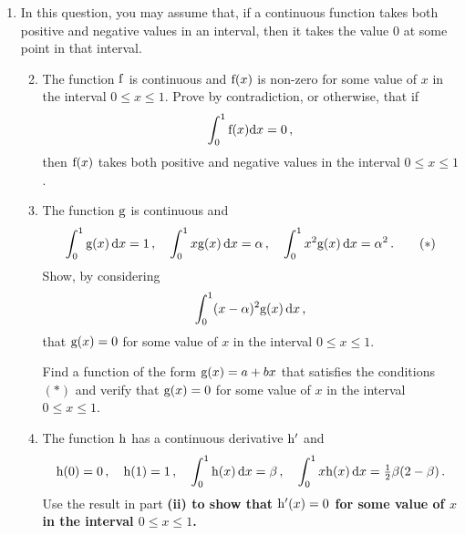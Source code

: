 \documentclass[a4, 11pt]{report}
\newlength{\qspace}
\newcounter{qnumber}
\newenvironment{question}%
 {\vspace{\qspace}
  \begin{enumerate}[\bfseries 1\quad][10]%
    \setcounter{enumi}{\value{qnumber}}%
    \item%
 }
{
  \end{enumerate}
  \filbreak
  \stepcounter{qnumber}
 }
\newenvironment{questionparts}[1][1]%
 {
  \begin{enumerate}[\bfseries (i)]%
    \setcounter{enumii}{#1}
    \addtocounter{enumii}{-1}
    \setlength{\itemsep}{5mm}
    \setlength{\parskip}{8pt}
 }
 {
  \end{enumerate}
 }
\def\d{{\rm d}}
\def\g{{\rm g}}
\def\h{{\rm h}}
\def\f{{\rm f}}
\def\le{\leqslant}
\newcommand{\ds}{\displaystyle}
\newcommand{\ts}{\textstyle}
\begin{document}
\vspace{-3mm}

\begin{question}

In this question, you may assume that, if a continuous  function 
takes both positive and negative values in an interval, then
it takes the value $0$ at some point in that interval. 


\begin{questionparts}
\item
The function  $\f$ is continuous and $\f(x)$ is non-zero for some value 
of $x$ in the interval $0\le x \le 1$. Prove by contradiction, or otherwise,
 that if
\[
\int_0^1 \f(x) \d x = 0\,,
\]
then 
 $\f(x)$ takes both positive and negative values 
in the interval $0\le x\le 1$.


\item The function  $\g$ is continuous and
\[
\int_0^1 \g(x) \, \d x = 1\,,
 \quad 
\int_0^1 x\g(x) \, \d x = \alpha\, , 
\quad 
\int_0^1 x^2\g(x) \, \d x = \alpha^2\,.
\tag{$*$}
\] 
 Show, by considering
\[
\int_0^1 (x - \alpha)^2 \g(x) \, \d x
\,,
\]
 that
$\g(x)=0$ for some value of $x$ in the interval $0\le x\le 1$.

Find a function of the  form $\g(x) = a+bx$ that satisfies the conditions
$(*)$ and verify that $\g(x)=0$ for some value of $x$ in the interval 
$0\le x \le 1$.
\item
The function $\h$ has a continuous derivative $\h'$ and
\[
\h(0) = 0\,,
\quad 
\h(1) = 1\,,
\quad 
\int_0^1 \h(x) \, \d x = \beta\,, 
\quad 
\int_0^1 x \h(x) \, \d x = \ts \frac{1}{2} \ds \beta (2 - \beta)
\,.
\] 
Use the result in part \bf (ii) \rm to show that $\h^\prime(x)=0$ 
for some value of $x$ in the interval $0\le x\le 1$.

\end{questionparts}


\end{question}
\end{document}
